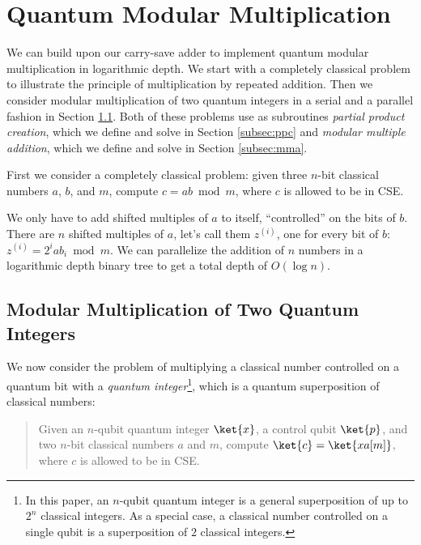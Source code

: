 \section{Quantum Modular Multiplication}
\label{sec:csa-mod-mult}

We can build upon our carry-save adder to implement quantum modular
multiplication in logarithmic depth. We start with a completely classical
problem to illustrate the principle of multiplication by repeated addition.
Then we consider modular multiplication of two quantum integers in a serial
and a parallel fashion in Section
\ref{subsec:csa-mod-mult-qq}. Both of these problems use as subroutines
\emph{partial product creation}, which we define and solve
 in Section \ref{subsec:ppc} and
 \emph{modular multiple addition}, which we define and solve
in Section \ref{subsec:mma}.

First we consider a completely classical problem:
given three $n$-bit classical numbers $a$, $b$, and $m$,
compute $c = ab \bmod m$, where $c$ is allowed to be in CSE.

We only have to add shifted
multiples of $a$ to itself, ``controlled'' on the bits of $b$. There are
$n$ shifted multiples of $a$, let's call them $z^{(i)}$, one for every bit of $b$:
$z^{(i)} = 2^i a b_i \bmod m$.
We can parallelize the addition of $n$ numbers in a logarithmic depth
binary tree to get a total depth of $O(\log n)$.

\subsection{Modular Multiplication of Two Quantum Integers}
\label{subsec:csa-mod-mult-qq}

We now consider the problem of multiplying a classical number controlled
on a quantum bit with a
\emph{quantum integer}\footnote{In this paper, an $n$-qubit 
quantum integer is a
general superposition of up to $2^n$ classical integers. As a special case,
a classical number controlled on a single qubit is a superposition of
$2$ classical integers.},
which is a
quantum superposition of classical numbers:

\begin{quote}
Given an $n$-qubit quantum integer $\ket{x}$, a control qubit $\ket{p}$,
and two $n$-bit classical numbers $a$
and $m$,
compute $\ket{c} = \ket{xa[m]}$, where $c$ is allowed to be in CSE.
\end{quote}

